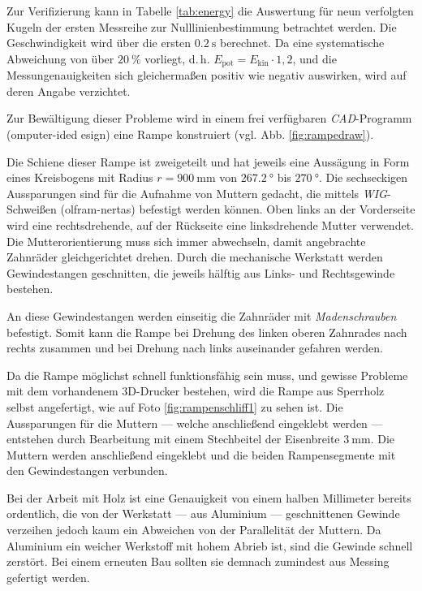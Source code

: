 

\noindent Zur Verifizierung kann in Tabelle \ref{tab:energy} die Auswertung für neun verfolgten Kugeln der ersten Messreihe zur Nulllinienbestimmung betrachtet werden. Die Geschwindigkeit wird über die ersten $\SI{0.2}{\second}$ berechnet. Da eine systematische Abweichung von über $\SI{20}{\percent}$ vorliegt, d.\,h. $E_\mathrm{pot}=E_\mathrm{kin} \cdot 1,2$, und die Messungenauigkeiten sich gleichermaßen positiv wie negativ auswirken, wird auf deren Angabe verzichtet.

Zur Bewältigung dieser Probleme wird in einem frei verfügbaren \textit{CAD}-Programm (omputer-ided esign) eine Rampe konstruiert (vgl. Abb. \ref{fig:rampedraw}).



\noindent Die Schiene dieser Rampe ist zweigeteilt und hat jeweils eine Aussägung in Form eines Kreisbogens mit Radius $r=\SI{900}{\milli\metre}$ von $\SI{267.2}{\degree}$ bis $\SI{270}{\degree}$. Die sechseckigen Aussparungen sind für die Aufnahme von Muttern gedacht, die mittels \textit{WIG}-Schweißen (olfram-nertas) befestigt werden können. Oben links an der Vorderseite wird eine rechtsdrehende, auf der Rückseite eine linksdrehende Mutter verwendet. Die Mutterorientierung muss sich immer abwechseln, damit angebrachte Zahnräder gleichgerichtet drehen. Durch die mechanische Werkstatt werden Gewindestangen geschnitten, die jeweils hälftig aus Links- und Rechtsgewinde bestehen. 

An diese Gewindestangen werden einseitig die Zahnräder mit \textit{Madenschrauben} befestigt. Somit kann die Rampe bei Drehung des linken oberen Zahnrades nach rechts zusammen und bei Drehung nach links auseinander gefahren werden.

Da die Rampe möglichst schnell funktionsfähig sein muss, und gewisse Probleme mit dem vorhandenem 3D-Drucker bestehen, wird die Rampe aus Sperrholz selbst angefertigt, wie auf Foto \ref{fig:rampenschliff1} zu sehen ist. Die Aussparungen für die Muttern --- welche anschließend eingeklebt werden --- entstehen durch Bearbeitung mit einem Stechbeitel der Eisenbreite $\SI{3}{\milli\metre}$. Die Muttern werden anschließend eingeklebt und die beiden Rampensegmente mit den Gewindestangen verbunden.



\noindent Bei der Arbeit mit Holz ist eine Genauigkeit von einem halben Millimeter bereits ordentlich, die von der Werkstatt --- aus Aluminium --- geschnittenen Gewinde verzeihen jedoch kaum ein Abweichen von der Parallelität der Muttern. Da Aluminium ein weicher Werkstoff mit hohem Abrieb ist, sind die Gewinde schnell zerstört. Bei einem erneuten Bau sollten sie demnach zumindest aus Messing gefertigt werden.

